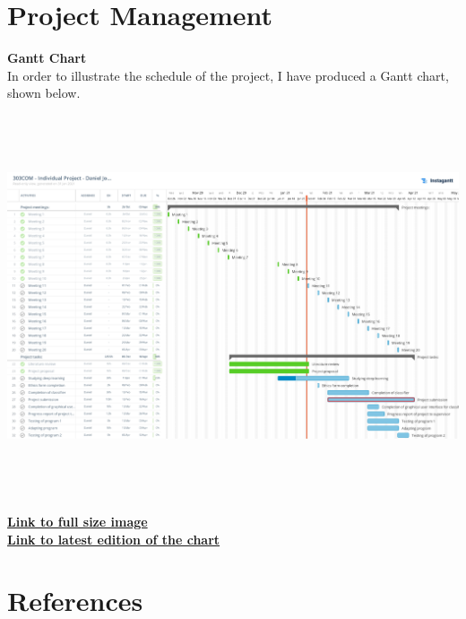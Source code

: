 \documentclass[12pt]{article}
\begin{document}
\section{Project Management}
\noindent \textbf{Gantt Chart}
\\
\noindent In order to illustrate the schedule of the project, I have produced a Gantt chart, shown below.
\\
\includegraphics[width=18cm, height=12cm]{Daniel_Jones_Gantt_Chart}
\\
\noindent \href{https://i.imgur.com/9tchO4N.jpg}{\color{blue}\textbf{Link to full size image}}
\\
\noindent \href{https://app.instagantt.com/shared/s/PdaKZZeApqszVu1eftjC/latest}{\color{blue}\textbf{Link to latest edition of the chart}}
\\
\newpage

\section{References}
\end{document}
